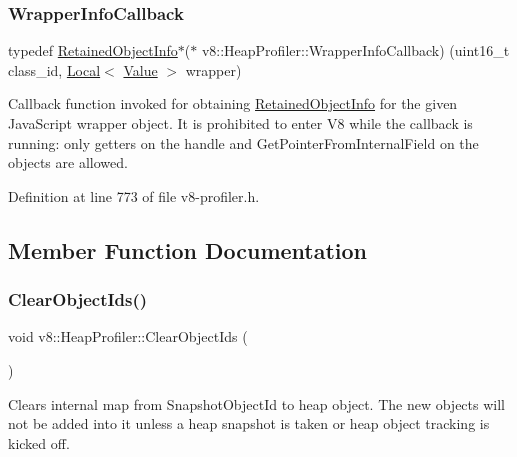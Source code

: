 \subsubsection{\texorpdfstring{Wrapper\+Info\+Callback}{WrapperInfoCallback}}
{\footnotesize\ttfamily typedef \mbox{\hyperlink{classv8_1_1RetainedObjectInfo}{Retained\+Object\+Info}}$\ast$($\ast$ v8\+::\+Heap\+Profiler\+::\+Wrapper\+Info\+Callback) (uint16\+\_\+t class\+\_\+id, \mbox{\hyperlink{classv8_1_1Local}{Local}}$<$ \mbox{\hyperlink{classv8_1_1Value}{Value}} $>$ wrapper)}

Callback function invoked for obtaining \mbox{\hyperlink{classv8_1_1RetainedObjectInfo}{Retained\+Object\+Info}} for the given Java\+Script wrapper object. It is prohibited to enter V8 while the callback is running\+: only getters on the handle and Get\+Pointer\+From\+Internal\+Field on the objects are allowed. 

Definition at line 773 of file v8-\/profiler.\+h.



\subsection{Member Function Documentation}
\mbox{\label{classv8_1_1HeapProfiler_a8a90c630543ed1875cbf9166239ff8d3}} 
\subsubsection{\texorpdfstring{Clear\+Object\+Ids()}{ClearObjectIds()}}
{\footnotesize\ttfamily void v8\+::\+Heap\+Profiler\+::\+Clear\+Object\+Ids (\begin{DoxyParamCaption}{ }\end{DoxyParamCaption})}

Clears internal map from Snapshot\+Object\+Id to heap object. The new objects will not be added into it unless a heap snapshot is taken or heap object tracking is kicked off. \mbox{\label{classv8_1_1HeapProfiler_a6a75bcc6d8350858597b6a6ce5e349a2}} 
